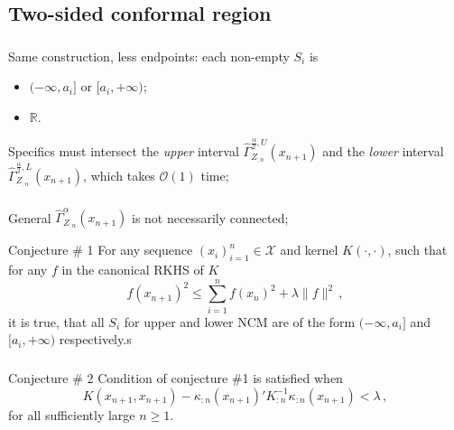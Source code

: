 \documentclass[t]{beamer}  %
\newcommand{\Xcal}{\mathcal{X}}
\newcommand{\Ocal}{\mathcal{O}}
\newcommand{\Real}{\mathbb{R}}
\begin{document}
\subsection{Two-sided conformal region} %
\label{sub:two_sided_conformal_region}

\begin{frame}[c]\frametitle{\insertsection}
  \framesubtitle{\insertsubsection}
  Same construction, less endpoints: each non-empty $S_i$ is \begin{itemize}
    \item $(-\infty, a_i]$ or $[a_i, +\infty)$;
    \item $\Real$.
  \end{itemize}
  \vspace{\baselineskip}
  \begin{block}{Specifics}
    must intersect the \textit{upper} interval $\hat{\Gamma}_{Z_{:n}}^{\frac{\alpha}{2}, U}(x_{n+1})$
    and the \textit{lower} interval $\hat{\Gamma}_{Z_{:n}}^{\frac{\alpha}{2}, L}(x_{n+1})$, which
    takes $\Ocal(1)$ time;
  \end{block}
\end{frame}

\begin{frame}[c]\frametitle{\insertsection}
  \framesubtitle{\insertsubsection}
  General $\hat{\Gamma}_{Z_{:n}}^\alpha(x_{n+1})$ is not necessarily connected;
  \vspace{\baselineskip}
  \begin{block}{Conjecture \# 1}
    For any sequence $(x_i)_{i=1}^n\in \Xcal$ and kernel $K(\cdot, \cdot)$, such
    that for any $f$ in the canonical RKHS of $K$
    $$ f(x_{n+1})^2 \leq \sum_{i=1}^n f(x_n)^2 + \lambda \|f\|^2 \,, $$
    it is true, that all $S_i$ for upper and lower NCM are of the form $(-\infty, a_i]$
    and $[a_i, +\infty)$ respectively.s
  \end{block}
\end{frame}

\begin{frame}[t]\frametitle{\insertsection}
  \framesubtitle{\insertsubsection}
  \begin{block}{Conjecture \# 2}
    Condition of conjecture \#1 is satisfied when
    $$ K(x_{n+1}, x_{n+1}) - \kappa_{:n}(x_{n+1})' K^{-1}_{:n} \kappa_{:n}(x_{n+1})
      < \lambda \,, $$
    for all sufficiently large $n\geq 1$.
  \end{block}
\end{frame}

\end{document}
